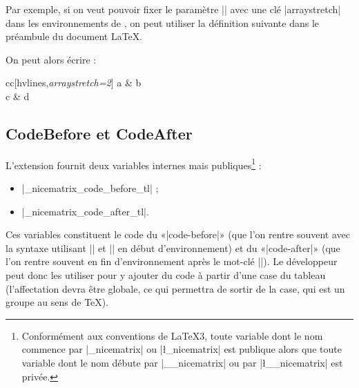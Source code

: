 \documentclass[dvipsnames]{article}
\begin{document}
\bigskip

\begin{scope}

Par exemple, si on veut pouvoir fixer le paramètre |\arraystretch| avec une clé
|arraystretch| dans les environnements de , on peut utiliser la
définition suivante dans le préambule du document LaTeX.

\bigskip
\begin{Code}[execute]
\end{Code}

\bigskip
On peut alors écrire :

\medskip
\begin{Code}[width=11cm,show-output]
\begin{NiceTabular}{cc}[hvlines,\emph{arraystretch=2}]
  a & b \\
  c & d 
\end{NiceTabular}
\end{Code}

\end{scope}


\subsection{CodeBefore et CodeAfter}


L'extension  fournit deux variables internes mais publiques\footnote{Conformément aux conventions de LaTeX3,
  toute variable dont le nom commence par |\g_nicematrix| ou |\l_nicematrix| est
  publique alors que toute variable dont le nom débute par |\g__nicematrix| ou
  par |\l__nicematrix| est privée.} :
\begin{itemize}[beginpenalty=10000]
\item |\g_nicematrix_code_before_tl| ;
\item |\g_nicematrix_code_after_tl|.
\end{itemize}

\medskip
Ces variables constituent le code du «|code-before|» (que l'on rentre souvent
avec la syntaxe utilisant |\CodeBefore| et |\Body| en début d'environnement) et
du «|code-after|» (que l'on rentre souvent en fin d'environnement après le
mot-clé |\CodeAfter|). Le développeur peut donc les utiliser pour y ajouter du
code à partir d'une case du tableau (l'affectation devra être globale, ce qui
permettra de sortir de la case, qui est un groupe au sens de TeX).
\end{document}
